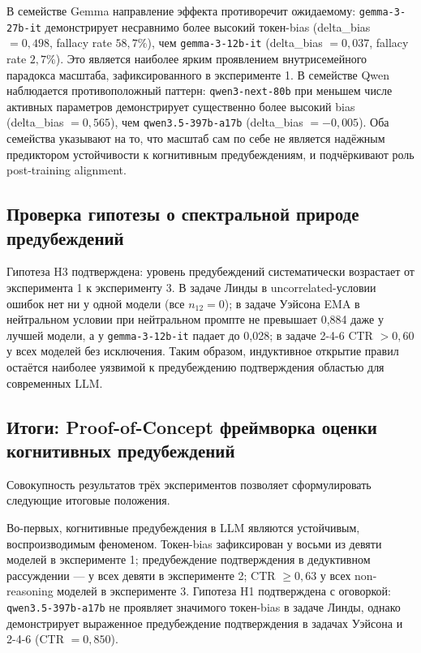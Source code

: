 В семействе Gemma направление эффекта противоречит ожидаемому: \texttt{gemma-3-27b-it} демонстрирует несравнимо более высокий токен-bias (delta\_bias $= 0{,}498$, fallacy rate $58{,}7\%$), чем \texttt{gemma-3-12b-it} (delta\_bias $= 0{,}037$, fallacy rate $2{,}7\%$). Это является наиболее ярким проявлением внутрисемейного парадокса масштаба, зафиксированного в эксперименте 1. В семействе Qwen наблюдается противоположный паттерн: \texttt{qwen3-next-80b} при меньшем числе активных параметров демонстрирует существенно более высокий bias (delta\_bias $= 0{,}565$), чем \texttt{qwen3.5-397b-a17b} (delta\_bias $= -0{,}005$). Оба семейства указывают на то, что масштаб сам по себе не является надёжным предиктором устойчивости к когнитивным предубеждениям, и подчёркивают роль post-training alignment.

\subsection{Проверка гипотезы о спектральной природе предубеждений}

Гипотеза H3 подтверждена: уровень предубеждений систематически возрастает от эксперимента 1 к эксперименту 3. В задаче Линды в uncorrelated-условии ошибок нет ни у одной модели (все $n_{12} = 0$); в задаче Уэйсона EMA в нейтральном условии при нейтральном промпте не превышает 0,884 даже у лучшей модели, а у \texttt{gemma-3-12b-it} падает до 0,028; в задаче 2-4-6 CTR $> 0{,}60$ у всех моделей без исключения. Таким образом, индуктивное открытие правил остаётся наиболее уязвимой к предубеждению подтверждения областью для современных LLM.

\subsection{Итоги: Proof-of-Concept фреймворка оценки когнитивных предубеждений}

Совокупность результатов трёх экспериментов позволяет сформулировать следующие итоговые положения.

Во-первых, когнитивные предубеждения в LLM являются устойчивым, воспроизводимым феноменом. Токен-bias зафиксирован у восьми из девяти моделей в эксперименте 1; предубеждение подтверждения в дедуктивном рассуждении --- у всех девяти в эксперименте 2; CTR $\geq 0{,}63$ у всех non-reasoning моделей в эксперименте 3. Гипотеза H1 подтверждена с оговоркой: \texttt{qwen3.5-397b-a17b} не проявляет значимого токен-bias в задаче Линды, однако демонстрирует выраженное предубеждение подтверждения в задачах Уэйсона и 2-4-6 (CTR $= 0{,}850$).

